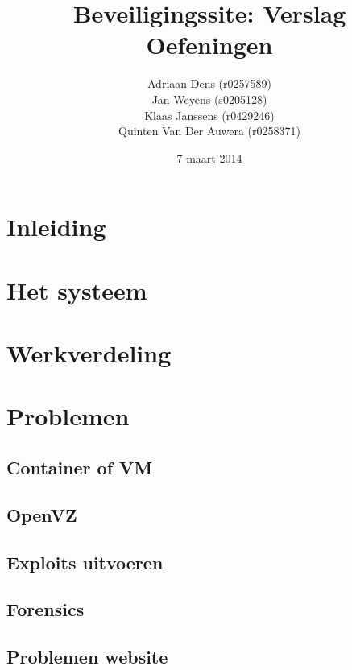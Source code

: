 \documentclass[a4paper,11pt]{report}
\begin{document}
\title{Beveiligingssite: Verslag Oefeningen}
\date{7 maart 2014}
\author{Adriaan Dens (r0257589)\\
	Jan Weyens (s0205128)\\
	Klaas Janssens (r0429246)\\
	Quinten Van Der Auwera (r0258371)
}	

\maketitle

\tableofcontents

\chapter{Inleiding}

\newpage

\chapter{Het systeem}


\chapter{Werkverdeling}

\newpage

\chapter{Problemen}


\section{Container of VM}


\section{OpenVZ}


\section{Exploits uitvoeren}


\section{Forensics}


\section{Problemen website}



\end{document}
